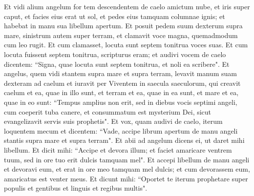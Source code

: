 \begin{biblechapter}  
\verse Et vidi alium angelum for tem descendentem de caelo amictum nube, et iris super caput, et facies eius erat ut sol, et pedes eius tamquam columnae ignis;  
\verse et habebat in manu sua libellum apertum. Et posuit pedem suum dexterum supra mare, sinistrum autem super terram, 
\verse et clamavit voce magna, quemadmodum cum leo rugit. Et cum clamasset, locuta sunt septem tonitrua voces suas. 
\verse Et cum locuta fuissent septem tonitrua, scripturus eram; et audivi vocem de caelo dicentem: “Signa, quae locuta sunt septem tonitrua, et noli ea scribere". 
\verse Et angelus, quem vidi stantem supra mare et supra terram, levavit manum suam dexteram ad caelum 
\verse et iuravit per Viventem in saecula saeculorum, qui creavit caelum et ea, quae in illo sunt, et terram et ea, quae in ea sunt, et mare et ea, quae in eo sunt: “Tempus amplius non erit, 
\verse sed in diebus vocis septimi angeli, cum coeperit tuba canere, et consummatum est mysterium Dei, sicut evangelizavit servis suis prophetis". 
\verse Et vox, quam audivi de caelo, iterum loquentem mecum et dicentem: “Vade, accipe librum apertum de manu angeli stantis supra mare et supra terram". 
\verse Et abii ad angelum dicens ei, ut daret mihi libellum. Et dicit mihi: “Accipe et devora illum; et faciet amaricare ventrem tuum, sed in ore tuo erit dulcis tamquam mel". 
\verse Et accepi libellum de manu angeli et devoravi eum, et erat in ore meo tamquam mel dulcis; et cum devorassem eum, amaricatus est venter meus. 
\verse Et dicunt mihi: “Oportet te iterum prophetare super populis et gentibus et linguis et regibus multis". 
\end{biblechapter}

